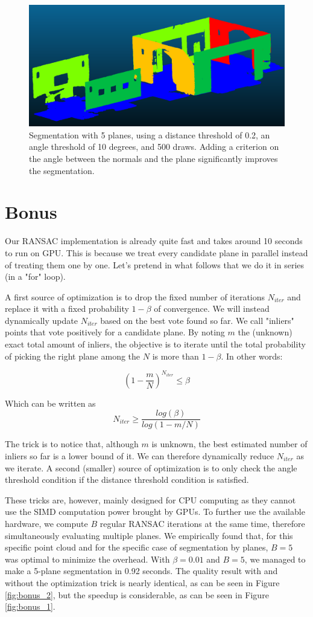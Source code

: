 \documentclass[a4paper]{article}
\begin{document}
\begin{figure}[ht]
    \centering
    \includegraphics[width=0.3\linewidth]{figures/Q4.png}
    \caption{Segmentation with 5 planes, using a distance threshold of 0.2, an angle threshold of 10 degrees, and 500 draws.
    Adding a criterion on the angle between the normals and the plane significantly improves the segmentation.}
    \label{fig:Q4}
\end{figure}

\section*{Bonus}
Our RANSAC implementation is already quite fast and takes around 10 seconds to run on GPU.
This is because we treat every candidate plane in parallel instead of treating them one by one. Let's pretend in what follows that we do it in series (in a "for" loop).

A first source of optimization is to drop the fixed number of iterations $N_{iter}$ and replace it with a fixed probability $1 - \beta$ of convergence.
We will instead dynamically update $N_{iter}$ based on the best vote found so far.
We call "inliers" points that vote positively for a candidate plane. By noting $m$ the (unknown) exact total amount of inliers,
the objective is to iterate until the total probability of picking the right plane among the $N$ is more than $1 - \beta$. In other words:

$$
(1 - \frac{m}{N})^{N_{iter}} \leq \beta
$$

Which can be written as 
$$
N_{iter} \geq \frac{log(\beta)} {log(1-m/N)}
$$

The trick is to notice that, although $m$ is unknown, the best estimated number of inliers so far is a lower bound of it. We can therefore dynamically reduce $N_{iter}$ as we iterate.
A second (smaller) source of optimization is to only check the angle threshold condition if the distance threshold condition is satisfied.

These tricks are, however, mainly designed for CPU computing as they cannot use the SIMD computation power brought by GPUs. To further use the available hardware, we compute $B$ regular RANSAC iterations at the same time, therefore simultaneously evaluating multiple planes.
We empirically found that, for this specific point cloud and for the specific case of segmentation by planes, $B=5$ was optimal to minimize the overhead.
With $\beta = 0.01$ and $B=5$, we managed to make a 5-plane segmentation in 0.92 seconds. The quality result with and without the optimization trick is nearly identical, as can be seen in Figure \ref{fig:bonus_2}, but the speedup is considerable, as can be seen in Figure \ref{fig:bonus_1}.
\end{document}
